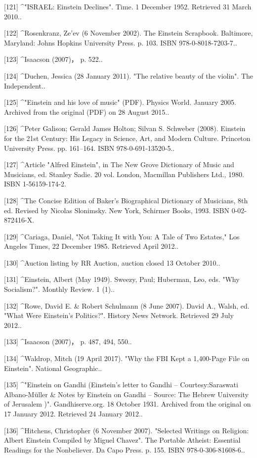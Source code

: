 [121]
^"ISRAEL: Einstein Declines". Time. 1 December 1952. Retrieved 31 March 2010..

[122]
^Rosenkranz, Ze'ev (6 November 2002). The Einstein Scrapbook. Baltimore, Maryland: Johns Hopkins University Press. p. 103. ISBN 978-0-8018-7203-7..

[123]
^Isaacson (2007)， p. 522..

[124]
^Duchen, Jessica (28 January 2011). "The relative beauty of the violin". The Independent..

[125]
^"Einstein and his love of music" (PDF). Physics World. January 2005. Archived from the original (PDF) on 28 August 2015..

[126]
^Peter Galison; Gerald James Holton; Silvan S. Schweber (2008). Einstein for the 21st Century: His Legacy in Science, Art, and Modern Culture. Princeton University Press. pp. 161–164. ISBN 978-0-691-13520-5..

[127]
^Article "Alfred Einstein", in The New Grove Dictionary of Music and Musicians, ed. Stanley Sadie. 20 vol. London, Macmillan Publishers Ltd., 1980. ISBN 1-56159-174-2.

[128]
^The Concise Edition of Baker's Biographical Dictionary of Musicians, 8th ed. Revised by Nicolas Slonimsky. New York, Schirmer Books, 1993. ISBN 0-02-872416-X.

[129]
^Cariaga, Daniel, "Not Taking It with You: A Tale of Two Estates," Los Angeles Times, 22 December 1985. Retrieved April 2012..

[130]
^Auction listing by RR Auction, auction closed 13 October 2010..

[131]
^Einstein, Albert (May 1949). Sweezy, Paul; Huberman, Leo, eds. "Why Socialism?". Monthly Review. 1 (1)..

[132]
^Rowe, David E. & Robert Schulmann (8 June 2007). David A., Walsh, ed. "What Were Einstein's Politics?". History News Network. Retrieved 29 July 2012..

[133]
^Isaacson (2007)， p. 487, 494, 550..

[134]
^Waldrop, Mitch (19 April 2017). "Why the FBI Kept a 1,400-Page File on Einstein". National Geographic..

[135]
^"Einstein on Gandhi (Einstein's letter to Gandhi – Courtesy:Saraswati Albano-Müller & Notes by Einstein on Gandhi – Source: The Hebrew University of Jerusalem )". Gandhiserve.org. 18 October 1931. Archived from the original on 17 January 2012. Retrieved 24 January 2012..

[136]
^Hitchens, Christopher (6 November 2007). "Selected Writings on Religion: Albert Einstein Compiled by Miguel Chavez". The Portable Atheist: Essential Readings for the Nonbeliever. Da Capo Press. p. 155. ISBN 978-0-306-81608-6..


